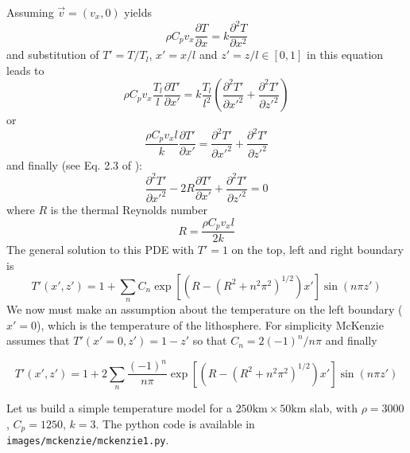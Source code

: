 Assuming $\vec v=(v_x,0)$ yields
\[
\rho C_p v_x \frac{\partial T}{\partial x} = k \frac{\partial^2 T}{\partial x^2}
\]
and substitution of $T'=T/T_l$, $x'=x/l$ and $z'=z/l\in[0,1]$ in this equation leads to
\[
\rho C_p v_x \frac{T_l}{l}\frac{\partial T'}{\partial x'} = k \frac{T_l}{l^2}
\left( \frac{\partial^2 T'}{\partial x'^2}
+ \frac{\partial^2 T'}{\partial z'^2} \right)
\]
or 
\[
\frac{\rho C_p v_x l }{k}\frac{\partial T'}{\partial x'} = 
\frac{\partial^2 T'}{\partial x'^2}
+ \frac{\partial^2 T'}{\partial z'^2} 
\]
and finally (see Eq. 2.3 of \cite{mcke69}): 
\[
\frac{\partial^2 T'}{\partial x'^2}
- 2 R \frac{\partial T'}{\partial x'} 
+ \frac{\partial^2 T'}{\partial z'^2} =0
\]
where $R$ is the thermal Reynolds number
\[
R=\frac{\rho C_p v_x l}{2 k}
\] 
The general solution to this PDE with $T'=1$ on the top, left and right boundary is 
\[
T'(x',z')= 1 + \sum_n C_n \exp \left[ \left( R-(R^2+n^2\pi^2)^{1/2} \right) x' \right] \sin (n \pi z')
\]
We now must make an assumption about the temperature on the left boundary ($x'=0$), 
which is the temperature of the lithosphere. 
For simplicity McKenzie assumes that $T'(x'=0,z')=1-z'$ so that $C_n=2(-1)^n/n\pi$ and finally
\begin{mdframed}[backgroundcolor=blue!5]
\begin{equation}
T'(x',z')= 1 + 2\sum_n \frac{(-1)^n}{n \pi} \exp \left[ \left( R-(R^2+n^2\pi^2)^{1/2} \right) x' \right] \sin (n \pi z')
\end{equation}
\end{mdframed}

Let us build a simple temperature model for a $250\text{km}\times 50\text{km}$ slab, 
with $\rho=3000$, $C_p=1250$, $k=3$. The python code is available in {\tt images/mckenzie/mckenzie1.py}.

